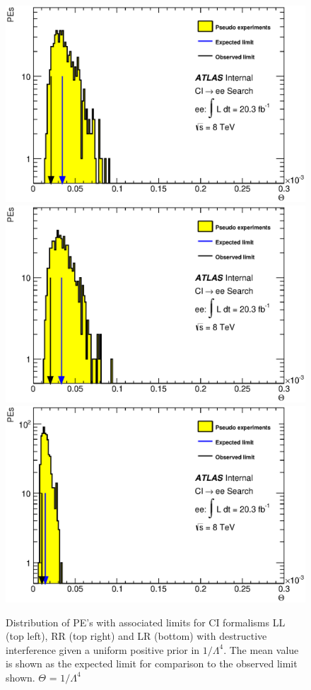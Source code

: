     \begin{figure}[h]
        \begin{center}
            \includegraphics[width=0.7\linewidth]{images/ee__LL_plus_L4/Theta.eps}
            \includegraphics[width=0.7\linewidth]{images/ee__RR_plus_L4/Theta.eps}
            \includegraphics[width=0.7\linewidth]{images/ee__LR_plus_L4/Theta.eps}
        \end{center}
       \caption{Distribution of PE's with associated limits for CI formalisms LL (top left), RR (top right) and LR (bottom) with destructive interference given a uniform positive prior in $1/\Lambda^{4}$. The mean value is shown as the expected limit for comparison to the observed limit shown. $\Theta$ = $1/\Lambda^{4}$}
       \label{fig:Theta_CI_des_4}
    \end{figure}








